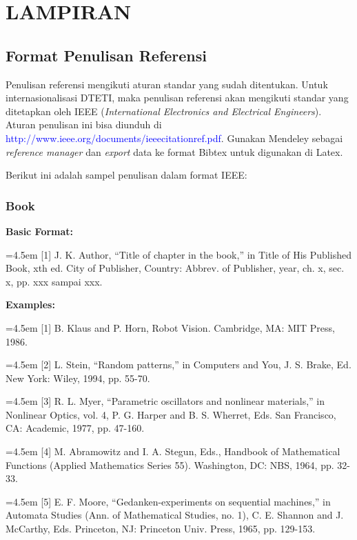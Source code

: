\chapter*{LAMPIRAN}

\section{Format Penulisan Referensi}

Penulisan referensi mengikuti aturan standar yang sudah ditentukan. Untuk 
internasionalisasi DTETI, maka penulisan referensi akan mengikuti standar yang 
ditetapkan oleh IEEE (\textit{International Electronics and Electrical Engineers}). Aturan penulisan ini bisa diunduh di \textcolor{blue}{http://www.ieee.org/documents/ieeecitationref.pdf}. Gunakan Mendeley sebagai \textit{reference manager} dan \textit{export} data ke format Bibtex untuk digunakan di Latex.

Berikut ini adalah sampel penulisan dalam format IEEE:

\subsection{Book}

\textbf{Basic Format:}

\hangindent=4.5em
[1] J. K. Author, “Title of chapter in the book,” in Title of His Published Book, xth ed. City of Publisher, Country: Abbrev. of Publisher, year, ch. x, sec. x, pp. xxx sampai xxx.

\textbf{Examples:}

\hangindent=4.5em 
[1] B. Klaus and P. Horn, Robot Vision. Cambridge, MA: MIT Press, 1986.

\hangindent=4.5em 
[2] L. Stein, “Random patterns,” in Computers and You, J. S. Brake, Ed. New York: Wiley, 1994, pp. 55-70.

\hangindent=4.5em 
[3] R. L. Myer, “Parametric oscillators and nonlinear materials,” in Nonlinear Optics, vol. 4, P. G. Harper and B. S. Wherret, Eds. San Francisco, CA: Academic, 1977, pp. 47-160.

\hangindent=4.5em 
[4] M. Abramowitz and I. A. Stegun, Eds., Handbook of Mathematical Functions (Applied Mathematics Series 55). Washington, DC: NBS, 1964, pp. 32-33.

\hangindent=4.5em 
[5] E. F. Moore, “Gedanken-experiments on sequential machines,” in Automata Studies 
(Ann. of Mathematical Studies, no. 1), C. E. Shannon and J. McCarthy, Eds. Princeton, NJ: Princeton Univ. Press, 1965, pp. 129-153.

